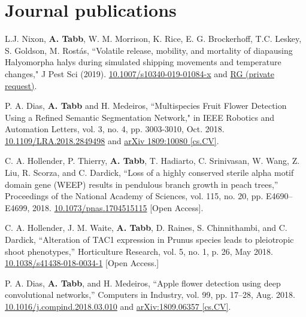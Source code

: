 \documentclass[letterpaper,11pt]{article}
\begin{document}
\section{Journal publications}
\begin{enumerate}[noitemsep, leftmargin=*,label={[\arabic*]}]
\item{L.J. Nixon, \textbf{A. Tabb}, W. M. Morrison, K. Rice, E. G. Brockerhoff, T.C. Leskey, S. Goldson, M. Rost\'{a}s, ``Volatile release, mobility, and mortality of diapausing Halyomorpha halys during simulated shipping movements and temperature changes," J Pest Sci (2019). \href{https://doi.org/10.1007/s10340-019-01084-x}{10.1007/s10340-019-01084-x} and \href{https://www.researchgate.net/publication/330836791_Volatile_release_mobility_and_mortality_of_diapausing_Halyomorpha_halys_during_simulated_shipping_movements_and_temperature_changes}{RG (private request)}.}

\item{P. A. Dias, \textbf{A. Tabb} and H. Medeiros, ``Multispecies Fruit Flower Detection Using a Refined Semantic Segmentation Network," in IEEE Robotics and Automation Letters, vol. 3, no. 4, pp. 3003-3010, Oct. 2018. \href{https://doi.org/10.1109/LRA.2018.2849498}{10.1109/LRA.2018.2849498} and \href{https://arxiv.org/abs/1809.10080}{arXiv 1809:10080 [cs.CV]}.}

\item{C. A. Hollender, P. Thierry, \textbf{A. Tabb}, T. Hadiarto, C. Srinivasan, W. Wang, Z. Liu, R. Scorza, and C. Dardick, ``Loss of a highly conserved sterile alpha motif domain gene (WEEP) results in pendulous branch growth in peach trees,” Proceedings of the National Academy of Sciences, vol. 115, no. 20, pp. E4690–E4699, 2018. \href{https://doi.org/10.1073/pnas.1704515115}{10.1073/pnas.1704515115} [Open Access].}

\item{C. A. Hollender, J. M. Waite, \textbf{A. Tabb}, D. Raines, S. Chinnithambi, and C. Dardick, ``Alteration of TAC1 expression in Prunus species leads to pleiotropic shoot phenotypes,” Horticulture Research, vol. 5, no. 1, p. 26, May 2018. \href{https://doi.org/10.1038/s41438-018-0034-1}{10.1038/s41438-018-0034-1} [Open Access.]}

\item{P. A. Dias, \textbf{A. Tabb}, and H. Medeiros, ``Apple flower detection using deep convolutional networks,” Computers in Industry, vol. 99, pp. 17–28, Aug. 2018. \href{https://doi.org/10.1016/j.compind.2018.03.010}{10.1016/j.compind.2018.03.010} and \href{https://arxiv.org/abs/1809.06357}{arXiv:1809.06357 [cs.CV]}.}


\end{enumerate}
\end{document}

